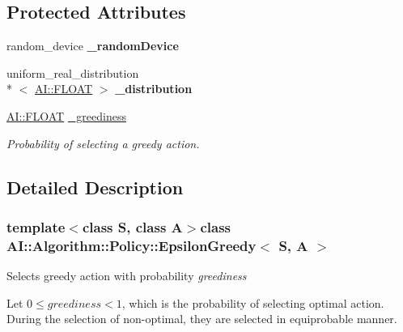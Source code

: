 \subsection*{Protected Attributes}
\begin{DoxyCompactItemize}
\item 
\hypertarget{classAI_1_1Algorithm_1_1Policy_1_1EpsilonGreedy_a54f479df739292986b34a7c79c1d9dee}{random\+\_\+device {\bfseries \+\_\+random\+Device}}\label{classAI_1_1Algorithm_1_1Policy_1_1EpsilonGreedy_a54f479df739292986b34a7c79c1d9dee}

\item 
\hypertarget{classAI_1_1Algorithm_1_1Policy_1_1EpsilonGreedy_af9535e90c13a9a47074721d72a765339}{uniform\+\_\+real\+\_\+distribution\\*
$<$ \hyperlink{namespaceAI_a41b74884a20833db653dded3918e05c3}{A\+I\+::\+F\+L\+O\+A\+T} $>$ {\bfseries \+\_\+distribution}}\label{classAI_1_1Algorithm_1_1Policy_1_1EpsilonGreedy_af9535e90c13a9a47074721d72a765339}

\item 
\hypertarget{classAI_1_1Algorithm_1_1Policy_1_1EpsilonGreedy_a2726a82fb23e6960c24402a756fef356}{\hyperlink{namespaceAI_a41b74884a20833db653dded3918e05c3}{A\+I\+::\+F\+L\+O\+A\+T} \hyperlink{classAI_1_1Algorithm_1_1Policy_1_1EpsilonGreedy_a2726a82fb23e6960c24402a756fef356}{\+\_\+greediness}}\label{classAI_1_1Algorithm_1_1Policy_1_1EpsilonGreedy_a2726a82fb23e6960c24402a756fef356}

\begin{DoxyCompactList}\small\item\em Probability of selecting a greedy action. \end{DoxyCompactList}\end{DoxyCompactItemize}


\subsection{Detailed Description}
\subsubsection*{template$<$class S, class A$>$class A\+I\+::\+Algorithm\+::\+Policy\+::\+Epsilon\+Greedy$<$ S, A $>$}

Selects greedy action with probability {\itshape greediness} 

Let $ 0 \leq greediness < 1 $, which is the probability of selecting optimal action. During the selection of non-\/optimal, they are selected in equiprobable manner.


